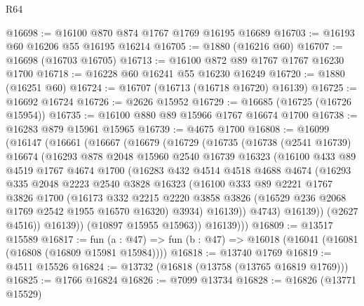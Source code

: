 \begin{lexlean}{R64}
\begin{coremodule}
@16698 := @16100 @870 @874 @1767 @1769 @16195 @16689
@16703 := @16193 @60 @16206 @55 @16195 @16214
@16705 := @1880 (@16216 @60)
@16707 := @16698 (@16703 @16705)
@16713 := @16100 @872 @89 @1767 @1767 @16230 @1700
@16718 := @16228 @60 @16241 @55 @16230 @16249
@16720 := @1880 (@16251 @60)
@16724 := @16707 (@16713 (@16718 @16720) @16139)
@16725 := @16692 @16724
@16726 := @2626 @15952
@16729 := @16685 (@16725 (@16726 @15954))
@16735 := @16100 @880 @89 @15966 @1767 @16674 @1700
@16738 := @16283 @879 @15961 @15965
@16739 := @4675 @1700
@16808 := @16099
    (@16147
      (@16661
        (@16667
          (@16679
            (@16729
              (@16735
                (@16738
                  (@2541 @16739)
                  @16674
                  (@16293
                    @878
                    @2048
                    @15960
                    @2540
                    @16739
                    @16323
                    (@16100
                      @433
                      @89
                      @4519
                      @1767
                      @4674
                      @1700
                      (@16283
                        @432
                        @4514
                        @4518
                        @4688
                        @4674
                        (@16293
                          @335
                          @2048
                          @2223
                          @2540
                          @3828
                          @16323
                          (@16100
                            @333
                            @89
                            @2221
                            @1767
                            @3826
                            @1700
                            (@16173
                              @332
                              @2215
                              @2220
                              @3858
                              @3826
                              (@16529 @236 @2068 @1769 @2542 @1955 @16570 @16320)
                              @3934)
                            @16139))
                        @4743)
                      @16139))
                  (@2627 @4516))
                @16139))
            (@10897 @15955 @15963))
          @16139)))
@16809 := @13517 @15589
@16817 := fun (a : @47) => fun (b : @47) => @16018 (@16041 (@16081 (@16808 (@16809 @15981 @15984))))
@16818 := @13740 @1769
@16819 := @4511 @15526
@16824 := @13732 (@16818 (@13758 (@13765 @16819 @1769)))
@16825 := @1766 @16824
@16826 := @7099 @13734
@16828 := @16826 (@13771 @15529)

\end{coremodule}
\end{lexlean}

